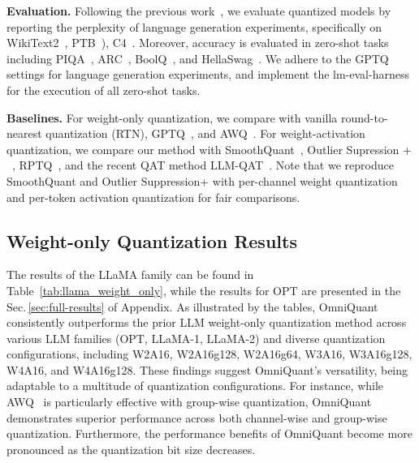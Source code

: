 \documentclass{article} %
\begin{document}

\textbf{Evaluation.} Following the previous work~\citep{awq,gptq}, we evaluate quantized models by reporting the perplexity of language generation experiments, specifically on WikiText2~\citep{wikitext2}, PTB~\citep{ptb}), C4~\citep{c4}. %
%
Moreover, accuracy is evaluated in zero-shot tasks including PIQA~\citep{piqa}, ARC~\citep{arc}, BoolQ~\citep{boolq}, and HellaSwag~\citep{arc}. We adhere to the GPTQ~\citep{gptq} settings for language generation experiments, and implement the lm-eval-harness~\citep{evaluation} for the execution of all zero-shot tasks.

\textbf{Baselines.} For weight-only quantization, we compare  with vanilla round-to-nearest quantization (RTN), GPTQ~\citep{gptq}, and AWQ~\citep{awq}. For weight-activation quantization, we compare our method with SmoothQuant~\citep{smoothquant}, Outlier Supression + ~\citep{outlier-plus}, RPTQ~\citep{rptq}, and the recent QAT method LLM-QAT~\citep{llmqat}. 
%
Note that we reproduce SmoothQuant and Outlier Suppression+ with per-channel weight quantization and per-token activation quantization for fair comparisons.









\subsection{Weight-only Quantization Results}
The results of the LLaMA family can be found in Table~\ref{tab:llama_weight_only}, while the results for OPT are presented in the Sec.\,\ref{sec:full-results} of Appendix. 
%
As illustrated by the tables, OmniQuant consistently outperforms the prior LLM weight-only quantization method across various LLM families (OPT, LLaMA-1, LLaMA-2) and diverse quantization configurations, including W2A16, W2A16g128, W2A16g64, W3A16, W3A16g128, W4A16, and W4A16g128.
%
These findings suggest OmniQuant's versatility, being adaptable to a multitude of quantization configurations. For instance, while AWQ~\citep{awq} is particularly effective with group-wise quantization, OmniQuant demonstrates superior performance across both channel-wise and group-wise quantization.
%
Furthermore, the performance benefits of OmniQuant become more pronounced as the quantization bit size decreases. 
\end{document}
